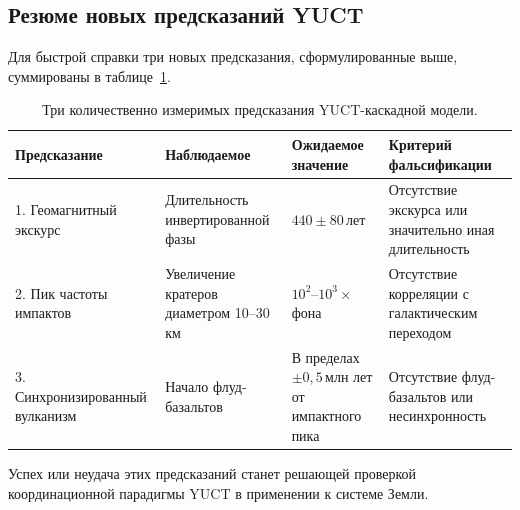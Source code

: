 \documentclass[11pt,a4paper]{article}
\begin{document}
	\subsection{Резюме новых предсказаний YUCT}
	
	Для быстрой справки три новых предсказания, сформулированные выше, суммированы в таблице~\ref{tab:new_predictions}.
	
	\begin{table}[H]
		\centering
		\small
		\caption{Три количественно измеримых предсказания YUCT-каскадной модели.}
		\label{tab:new_predictions}
		\begin{tabular}{p{3.9cm} p{4.4cm} p{4.7cm} p{4.0cm}}
			\toprule
			\textbf{Предсказание} & \textbf{Наблюдаемое} & \textbf{Ожидаемое значение} & \textbf{Критерий фальсификации} \\
			\midrule
			1. Геомагнитный экскурс & Длительность инвертированной фазы & \(440 \pm 80\) лет & Отсутствие экскурса или значительно иная длительность \\
			2. Пик частоты импактов & Увеличение кратеров диаметром 10–30 км & \(10^{2}\)–\(10^{3}\times\) фона & Отсутствие корреляции с галактическим переходом \\
			3. Синхронизированный вулканизм & Начало флуд-базальтов & В пределах \(\pm 0,5\) млн лет от импактного пика & Отсутствие флуд-базальтов или несинхронность \\
			\bottomrule
		\end{tabular}
	\end{table}
	
	Успех или неудача этих предсказаний станет решающей проверкой координационной парадигмы YUCT в применении к системе Земли.
	
\end{document}
